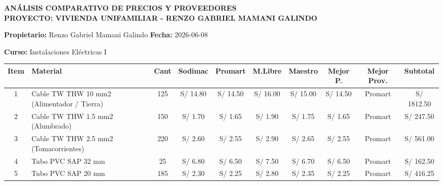 \documentclass[11pt,a4paper]{article}
\begin{document}
	
	\begin{landscape}
		
		\begin{center}
			{\LARGE\bfseries\color{navyblue} ANÁLISIS COMPARATIVO DE PRECIOS Y PROVEEDORES}\\[0.2cm]
			{\large\bfseries PROYECTO: VIVIENDA UNIFAMILIAR - RENZO GABRIEL MAMANI GALINDO}
		\end{center}
		
		\vspace{0.4cm}
		
		\textbf{Propietario:} Renzo Gabriel Mamani Galindo
		\hfill
		\textbf{Fecha:} 2026-06-08
		
		\textbf{Curso:} Instalaciones Eléctricas I
		
		\vspace{0.4cm}
		
		\begin{table}[H]
			\centering
			\begin{scriptsize}
				
				\begin{tabularx}{1.30\textwidth}{c X c c c c c c c c}
					\toprule
					\textbf{Item} &
					\textbf{Material} &
					\textbf{Cant} &
					\textbf{Sodimac} &
					\textbf{Promart} &
					\textbf{M.Libre} &
					\textbf{Maestro} &
					\textbf{Mejor P.} &
					\textbf{Mejor Prov.} &
					\textbf{Subtotal} \\
					\midrule
					
					1 & Cable TW THW 10 mm2 (Alimentador / Tierra) & 125 &
					S/ 14.80 & S/ 14.50 & S/ 16.00 & S/ 15.00 &
					S/ 14.50 & Promart & S/ 1812.50 \\
					
					2 & Cable TW THW 1.5 mm2 (Alumbrado) & 150 &
					S/ 1.70 & S/ 1.65 & S/ 1.90 & S/ 1.75 &
					S/ 1.65 & Promart & S/ 247.50 \\
					
					3 & Cable TW THW 2.5 mm2 (Tomacorrientes) & 220 &
					S/ 2.60 & S/ 2.55 & S/ 2.90 & S/ 2.65 &
					S/ 2.55 & Promart & S/ 561.00 \\
					
					4 & Tubo PVC SAP 32 mm & 25 &
					S/ 6.80 & S/ 6.50 & S/ 7.50 & S/ 6.70 &
					S/ 6.50 & Promart & S/ 162.50 \\
					
					5 & Tubo PVC SAP 20 mm & 185 &
					S/ 2.30 & S/ 2.25 & S/ 2.80 & S/ 2.35 &
					S/ 2.25 & Promart & S/ 416.25 \\
					

\end{tabularx}
\end{scriptsize}
\end{table}
\end{landscape}
\end{document}
